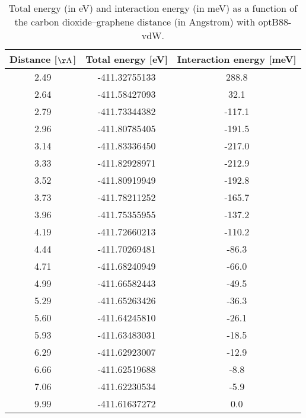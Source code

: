 \begin{table}[h]
\centering
\begin{tabular}{ccc}
\hline
Distance [$\mathrm{\AA}$] & Total energy [eV] & Interaction energy [meV] \\
\hline
2.49 & -411.32755133 & 288.8 \\
2.64 & -411.58427093 & 32.1 \\
2.79 & -411.73344382 & -117.1 \\
2.96 & -411.80785405 & -191.5 \\
3.14 & -411.83336450 & -217.0 \\
3.33 & -411.82928971 & -212.9 \\
3.52 & -411.80919949 & -192.8 \\
3.73 & -411.78211252 & -165.7 \\
3.96 & -411.75355955 & -137.2 \\
4.19 & -411.72660213 & -110.2 \\
4.44 & -411.70269481 & -86.3 \\
4.71 & -411.68240949 & -66.0 \\
4.99 & -411.66582443 & -49.5 \\
5.29 & -411.65263426 & -36.3 \\
5.60 & -411.64245810 & -26.1 \\
5.93 & -411.63483031 & -18.5 \\
6.29 & -411.62923007 & -12.9 \\
6.66 & -411.62519688 & -8.8 \\
7.06 & -411.62230534 & -5.9 \\
9.99 & -411.61637272 & 0.0 \\
\hline
\end{tabular}
\caption{Total energy (in eV) and interaction energy (in meV) as a function of the carbon dioxide--graphene distance (in Angstrom) with optB88-vdW.}
\label{SI_dft_table_optB88-vdW}
\end{table}